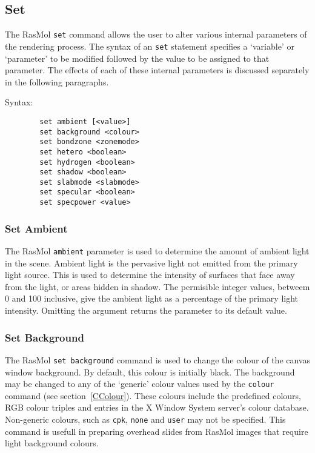 \subsection{Set}
\label{CSet}

The RasMol {\tt set} command allows the user to alter various internal 
parameters of the rendering process. The syntax of an {\tt set} statement
specifies a `variable' or `parameter' to be modified followed by the value
to be assigned to that parameter. The effects of each of these internal
parameters is discussed separately in the following paragraphs.

Syntax:
\begin{verbatim}
        set ambient [<value>]
        set background <colour>
        set bondzone <zonemode>
        set hetero <boolean>
        set hydrogen <boolean>
        set shadow <boolean>
        set slabmode <slabmode>
        set specular <boolean>
        set specpower <value>
\end{verbatim}

\subsubsection*{Set Ambient}
The RasMol {\tt ambient} parameter is used to determine the amount of
ambient light in the scene. Ambient light is the pervasive light not
emitted from the primary light source. This is used to determine the
intensity of surfaces that face away from the light, or areas hidden in
shadow. The permisible integer values, betweem 0 and 100 inclusive, give
the ambient light as a percentage of the primary light intensity. Omitting
the argument returns the parameter to its default value.

\subsubsection*{Set Background}
The RasMol {\tt set background} command is used to change the colour of the
canvas window background. By default, this colour is initially black. The
background may be changed to any of the `generic' colour values used by the
{\tt colour} command (see section~\ref{CColour}). These colours include the
predefined colours, RGB colour triples and entries in the X Window System 
server's colour database. Non-generic colours, such as {\tt cpk}, {\tt none}
and {\tt user} may not be specified. This command is usefull in preparing
overhead slides from RasMol images that require light background colours.


